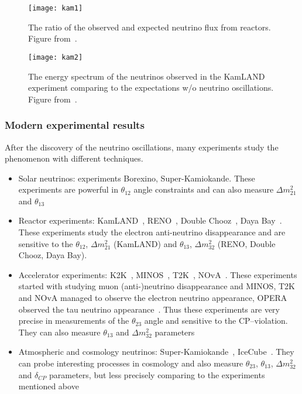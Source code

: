 \documentclass[../main.tex]{subfiles}
\begin{document}
\begin{figure}
  \centering
  \begin{minipage}{0.45\linewidth}
  \centering
    \texttt{[image: kam1]}
    \caption{The ratio of the observed and expected neutrino flux from reactors. Figure from~\cite{Eguchi2003}.}
    \label{fig:intro:kam1}
  \end{minipage}
  \begin{minipage}{0.09\linewidth}
    \hspace{\linewidth}
  \end{minipage}
  \begin{minipage}{0.45\linewidth}
  \centering
    \texttt{[image: kam2]}
    \caption{The energy spectrum of the neutrinos observed in the KamLAND experiment comparing to the expectations w/o neutrino oscillations. Figure from~\cite{Eguchi2003}.}
    \label{fig:intro:kam2}
  \end{minipage}
\end{figure}

\subsubsection{Modern experimental results}
After the discovery of the neutrino oscillations, many experiments study the phenomenon with different techniques.
\begin{itemize}
  \item Solar neutrinos: experiments Borexino, Super-Kamiokande. These experiments are powerful in $\theta_{12}$ angle constraints and can also measure $\Delta m_{21}^2$ and $\theta_{13}$
  \item Reactor experiments: KamLAND~\cite{Eguchi2003}, RENO~\cite{Ahn2012}, Double Chooz~\cite{Abe2014}, Daya Bay~\cite{An2014}. These experiments study the electron anti-neutrino disappearance and are sensitive to the  $\theta_{12}$, $\Delta m_{21}^2$ (KamLAND) and $\theta_{13}$, $\Delta m_{32}^2$ (RENO, Double Chooz, Daya Bay).
  \item Accelerator experiments: K2K~\cite{Ahn2006}, MINOS~\cite{Adamson2014}, T2K~\cite{Abe2020a}, NOvA~\cite{Acero2019}. These experiments started with studying muon (anti-)neutrino disappearance and MINOS, T2K and NOvA managed to observe the electron neutrino appearance, OPERA observed the tau neutrino appearance~\cite{Agafonova2014}. Thus these experiments are very precise in measurements of the $\theta_{23}$ angle and sensitive to the CP--violation. They can also measure $\theta_{13}$ and $\Delta m^2_{32}$ parameters
  \item Atmospheric and cosmology neutrinos: Super-Kamiokande~\cite{Jiang2019}, IceCube~\cite{Deyoung2005}. They can probe interesting processes in cosmology and also measure $\theta_{23}$, $\theta_{13}$, $\Delta m^2_{32}$ and $\delta_{CP}$ parameters, but less precisely comparing to the experiments mentioned above
\end{itemize}
\end{document}
